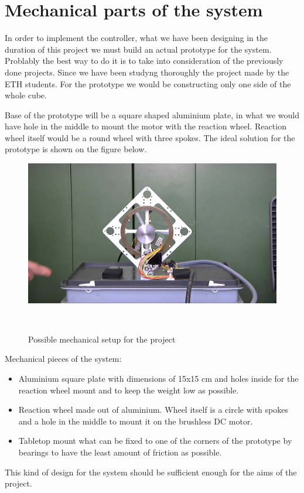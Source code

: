\section{Mechanical parts of the system}

In order to implement the controller, what we have been designing in the duration of this project we must build an actual prototype for the system.
Problably the best way to do it is to take into consideration of the previously done projects.
Since we have been studyng thoroughly the project made by the ETH students\cite{cubli12}.
For the prototype we would be constructing only one side of the whole cube.

Base of the prototype will be a square shaped aluminium plate, in what we would have hole in the middle to mount the motor with the reaction wheel.
Reaction wheel itself would be a round wheel with three spokes.
The ideal solution for the prototype is shown on the figure below.
\begin{figure}[H]

	
	\centering
 	\includegraphics[width=1\textwidth]{images/mechsetup.jpg}
	
	~
	\caption{Possible mechanical setup for the project\cite{cublipic}} 
 	\label{fig:mech} 
\end{figure}

Mechanical pieces of the system:
\begin{itemize}
 \item Aluminium square plate with dimensions of 15x15 cm and holes inside for the reaction wheel mount and to keep the weight low as possible.
 \item Reaction wheel made out of aluminium. Wheel itself is a circle with spokes and a hole in the middle to mount it on the brushless DC motor.
 \item Tabletop mount what can be fixed to one of the corners of the prototype by bearings to have the least amount of friction as possible.
\end{itemize}

This kind of design for the system should be sufficient enough for the aims of the project.